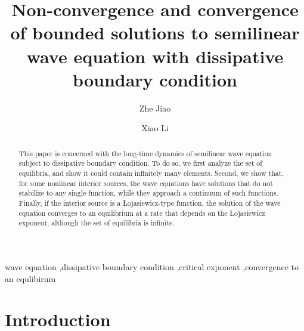 \documentclass{elsarticle}
\begin{document}
\begin{frontmatter}

\title{Non-convergence and convergence of bounded solutions to semilinear wave equation with dissipative boundary condition}



\author[mainaddress]{Zhe Jiao}


\author[mainaddress]{Xiao Li}

\address[mainaddress]{School of Mathematics and Statistics, MOE Key Laboratory for Complexity Science in Aerospace, Northwestern Polytechnical University, Xi'an 710129, China}


\begin{abstract}
This paper is concerned with the long-time dynamics of semilinear wave equation subject to dissipative boundary condition.
To do so, we first analyze the set of equilibria, and show it could contain infinitely many elements. 
Second, we show that, for some nonlinear interior sources, the wave equations have solutions that do not stabilize to any single function, while they approach a continuum of such functions.
Finally, if the interior source is a {\L}ojasiewicz-type function, the solution of the wave equation converges to an equilibrium at a rate that depends on the {\L}ojasiewicz exponent, although the set of equilibria is infinite.

\end{abstract}

\begin{keyword}
wave equation \sep dissipative boundary condition \sep critical exponent \sep convergence to an equlibirum
\end{keyword}

\end{frontmatter}


\section{Introduction}
\label{sec:intro}
\end{document}
